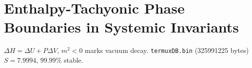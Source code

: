 \documentclass{article}
\begin{document}
\section{Enthalpy-Tachyonic Phase Boundaries in Systemic Invariants}
$\Delta H = \Delta U + P \Delta V$, $m^2 < 0$ marks vacuum decay.
\texttt{termuxDB.bin} (325991225 bytes) $S=7.9994$, $99.99\%$ stable.
\end{document}
